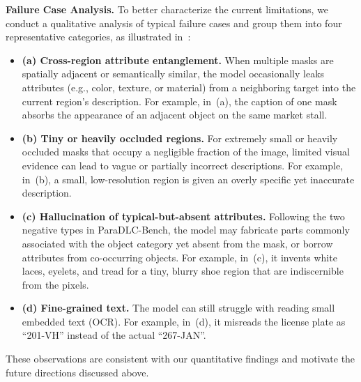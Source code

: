 \documentclass{llmxive}
\begin{document}
\noindent
\textbf{Failure Case Analysis.}
To better characterize the current limitations, we conduct a qualitative analysis of typical failure cases and group them into four representative categories, as illustrated in~:
\begin{itemize}
    \item \textbf{(a) Cross-region attribute entanglement.} When multiple masks are spatially adjacent or semantically similar, the model occasionally leaks attributes (e.g., color, texture, or material) from a neighboring target into the current region's description. For example, in~(a), the caption of one mask absorbs the appearance of an adjacent object on the same market stall.
    \item \textbf{(b) Tiny or heavily occluded regions.} For extremely small or heavily occluded masks that occupy a negligible fraction of the image, limited visual evidence can lead to vague or partially incorrect descriptions. For example, in~(b), a small, low-resolution region is given an overly specific yet inaccurate description.
    \item \textbf{(c) Hallucination of typical-but-absent attributes.} Following the two negative types in ParaDLC-Bench, the model may fabricate parts commonly associated with the object category yet absent from the mask, or borrow attributes from co-occurring objects. For example, in~(c), it invents white laces, eyelets, and tread for a tiny, blurry shoe region that are indiscernible from the pixels.
    \item \textbf{(d) Fine-grained text.} The model can still struggle with reading small embedded text (OCR). For example, in~(d), it misreads the license plate as ``201-VH'' instead of the actual ``267-JAN''.
\end{itemize}
These observations are consistent with our quantitative findings and motivate the future directions discussed above.
\end{document}
